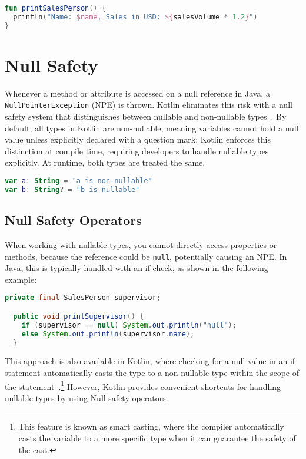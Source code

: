 \documentclass[a4paper,11pt]{article}
\begin{document}
\begin{lstlisting}[language=Kotlin, title={String Interpolation}]
fun printSalesPerson() {
  println("Name: $name, Sales in USD: ${salesVolume * 1.2}")
}
\end{lstlisting}

\section{Null Safety}
Whenever a method or attribute is accessed on a null reference in Java, a \texttt{NullPointerException} (NPE) is thrown. Kotlin eliminates this risk with a null safety system that distinguishes between nullable and non-nullable types~\cite{nullsafety,nullsafety-nullable-types}. By default, all types in Kotlin are non-nullable, meaning variables cannot hold a null value unless explicitly declared with a question mark:
Kotlin enforces this distinction at compile time, requiring developers to handle nullable types explicitly. At runtime, both types are treated the same.
\begin{lstlisting}[language=Kotlin]
var a: String = "a is non-nullable"
var b: String? = "b is nullable"
\end{lstlisting}

\subsection{Null Safety Operators}
When working with nullable types, you cannot directly access properties or methods, because the reference could be \texttt{null}, potentially causing an NPE\@.
In Java, this is typically handled with an if check, as shown in the following example:
\begin{lstlisting}[language=Java]
  private final SalesPerson supervisor;

  public void printSupervisor() {
    if (supervisor == null) System.out.println("null");
    else System.out.println(supervisor.name);
  }
\end{lstlisting}

This approach is also available in Kotlin, where checking for a null value in an if statement automatically casts the type to a non-nullable type within the scope of the statement~\cite{nullsafety-if-condition}.\footnote{This feature is known as smart casting, where the compiler automatically casts the variable to a more specific type when it can guarantee the safety of the cast.}
However, Kotlin provides convenient shortcuts for handling nullable types by using Null safety operators.
\end{document}
